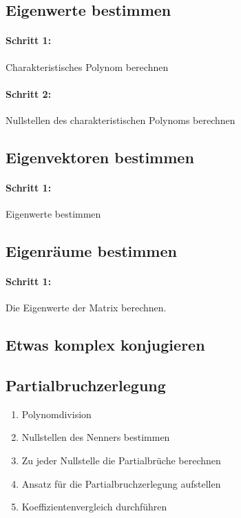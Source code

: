 \documentclass[9pt]{article} %
\begin{document}
\subsection{Eigenwerte bestimmen} 
\paragraph{Schritt 1: } Charakteristisches Polynom berechnen
\paragraph{Schritt 2:} Nullstellen des charakteristischen Polynoms berechnen
\subsection{Eigenvektoren bestimmen}
\paragraph{Schritt 1: } Eigenwerte bestimmen
\subsection{Eigenräume bestimmen}
\paragraph{Schritt 1:} Die Eigenwerte der Matrix berechnen. 
\subsection{Etwas komplex konjugieren}


\subsection{Partialbruchzerlegung} \label{sec:anleitungpartialbruchzerlegung}
\begin{enumerate}
    \item Polynomdivision
    \item Nullstellen des Nenners bestimmen
    \item Zu jeder Nullstelle die Partialbrüche berechnen
    \item Ansatz für die Partialbruchzerlegung aufstellen
    \item Koeffizientenvergleich durchführen
\end{enumerate}

\printindex
 \printbibliography
\end{document}
